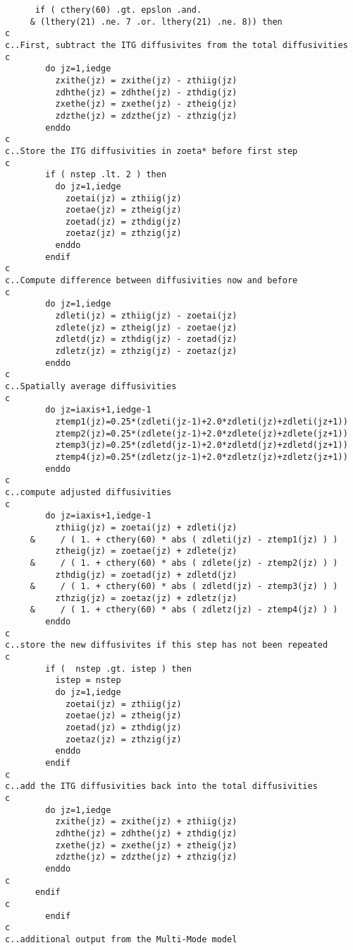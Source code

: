 \begin{verbatim}
      if ( cthery(60) .gt. epslon .and.
     & (lthery(21) .ne. 7 .or. lthery(21) .ne. 8)) then
c
c..First, subtract the ITG diffusivites from the total diffusivities
c
        do jz=1,iedge
          zxithe(jz) = zxithe(jz) - zthiig(jz)
          zdhthe(jz) = zdhthe(jz) - zthdig(jz)
          zxethe(jz) = zxethe(jz) - ztheig(jz)
          zdzthe(jz) = zdzthe(jz) - zthzig(jz)
        enddo
c
c..Store the ITG diffusivities in zoeta* before first step
c
        if ( nstep .lt. 2 ) then
          do jz=1,iedge
            zoetai(jz) = zthiig(jz)
            zoetae(jz) = ztheig(jz)
            zoetad(jz) = zthdig(jz)
            zoetaz(jz) = zthzig(jz)
          enddo
        endif
c
c..Compute difference between diffusivities now and before
c
        do jz=1,iedge
          zdleti(jz) = zthiig(jz) - zoetai(jz)
          zdlete(jz) = ztheig(jz) - zoetae(jz)
          zdletd(jz) = zthdig(jz) - zoetad(jz)
          zdletz(jz) = zthzig(jz) - zoetaz(jz)
        enddo
c
c..Spatially average diffusivities
c
        do jz=iaxis+1,iedge-1
          ztemp1(jz)=0.25*(zdleti(jz-1)+2.0*zdleti(jz)+zdleti(jz+1))
          ztemp2(jz)=0.25*(zdlete(jz-1)+2.0*zdlete(jz)+zdlete(jz+1))
          ztemp3(jz)=0.25*(zdletd(jz-1)+2.0*zdletd(jz)+zdletd(jz+1))
          ztemp4(jz)=0.25*(zdletz(jz-1)+2.0*zdletz(jz)+zdletz(jz+1))
        enddo
c
c..compute adjusted diffusivities
c
        do jz=iaxis+1,iedge-1
          zthiig(jz) = zoetai(jz) + zdleti(jz)
     &     / ( 1. + cthery(60) * abs ( zdleti(jz) - ztemp1(jz) ) )
          ztheig(jz) = zoetae(jz) + zdlete(jz)
     &     / ( 1. + cthery(60) * abs ( zdlete(jz) - ztemp2(jz) ) )
          zthdig(jz) = zoetad(jz) + zdletd(jz)
     &     / ( 1. + cthery(60) * abs ( zdletd(jz) - ztemp3(jz) ) )
          zthzig(jz) = zoetaz(jz) + zdletz(jz)
     &     / ( 1. + cthery(60) * abs ( zdletz(jz) - ztemp4(jz) ) )
        enddo
c
c..store the new diffusivites if this step has not been repeated
c
        if (  nstep .gt. istep ) then
          istep = nstep
          do jz=1,iedge
            zoetai(jz) = zthiig(jz)
            zoetae(jz) = ztheig(jz)
            zoetad(jz) = zthdig(jz)
            zoetaz(jz) = zthzig(jz)
          enddo
        endif
c
c..add the ITG diffusivities back into the total diffusivities
c
        do jz=1,iedge
          zxithe(jz) = zxithe(jz) + zthiig(jz)
          zdhthe(jz) = zdhthe(jz) + zthdig(jz)
          zxethe(jz) = zxethe(jz) + ztheig(jz)
          zdzthe(jz) = zdzthe(jz) + zthzig(jz)
        enddo
c
      endif
c
        endif
c
c..additional output from the Multi-Mode model

\end{verbatim}
